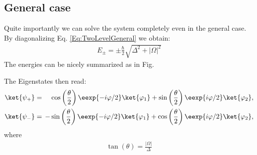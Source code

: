 \subsection{General case}

Quite importantly we can solve the system completely even in the general case. By diagonalizing  Eq. \eqref{Eq:TwoLevelGeneral} we obtain:
\begin{align}\label{eq:Epm}
 E_\pm = \pm \frac{\hbar}{2} \sqrt{\Delta^2+|\Omega|^2}
\end{align}
The energies can be nicely summarized as in Fig. 


The Eigenstates then read:
\begin{align}
				\ket{\psi_+}&=&\hspace{-2mm}&\cos\left(\frac{\theta}{2}\right) \eexp{-i{\varphi}/{2}}\ket{\varphi_1}+\sin\left(\frac{\theta}{2}\right) \eexp{i{\varphi}/{2}}\ket{\varphi_2}, \label{eq:staticpsiplus} \\ 
				\ket{\psi_-}&=&\hspace{-2mm}-&\sin\left(\frac{\theta}{2}\right) \eexp{-i{\varphi}/{2}}\ket{\varphi_1}+\cos\left(\frac{\theta}{2}\right) \eexp{i{\varphi}/{2}}\ket{\varphi_2}, \label{eq:staticpsiminus}
\end{align}
where 
\begin{align} \label{eq:parameters}
	\tan(\theta) = \frac{|\Omega|}{\Delta} 
\end{align}